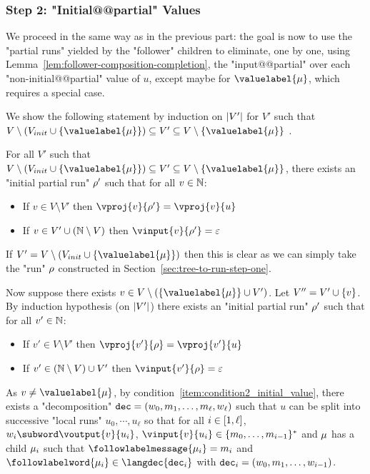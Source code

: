 	\subsubsection{Step 2: "Initial@@partial" Values}
	\label{sec:tree-to-run-step-two}
	
	We proceed in the same way as in the previous part: the goal is now to use the "partial runs" yielded by the "follower" children to eliminate, one by one, using Lemma~\ref{lem:follower-composition-completion}, the "input@@partial" over each "non-initial@@partial" value of $u$, except maybe for $\valuelabel{\node}$, which requires a special case.
	
	We show the following statement by induction on $|V'|$ for $V'$ such that $V \setminus (V_{init} \cup \set{\valuelabel{\node}}) \subseteq V' \subseteq V \setminus \set{\valuelabel{\node}}$ .
	
	For all $V'$ such that $V \setminus (V_{init} \cup \set{\valuelabel{\node}}) \subseteq V' \subseteq V \setminus \set{\valuelabel{\node}}$, there exists an "initial partial run" $\rho'$ such that for all $v \in \mathbb{N}$:
	\begin{itemize}		
		\item If $v \in V \setminus V'$ then $\vproj{v}{\run'} = \vproj{v}{u}$
		
		\item If $v \in V' \cup (\mathbb{N} \setminus V)$ then $\vinput{v}{\run'} = \epsilon$
	\end{itemize}  

If $V' = V \setminus (V_{init} \cup \set{\valuelabel{\node}})$ then this is clear as we can simply take the "run" $\rho$ constructed in Section~\ref{sec:tree-to-run-step-one}.

Now suppose there exists $v \in V \setminus (\set{\valuelabel{\node}} \cup V')$. Let $V'' = V' \cup \{v\}$. By induction hypothesis (on $|V'|$) there exists an "initial partial run" $\rho'$ such that for all $v' \in \mathbb{N}$:
\begin{itemize}
	\item If $v' \in V \setminus V'$ then $\vproj{v'}{\run} = \vproj{v'}{u}$
	
	\item If $v' \in (\mathbb{N} \setminus V) \cup V'$ then $\vinput{v'}{\run} = \epsilon$
\end{itemize}

As $v \neq \valuelabel{\node}$, by condition~\ref{item:condition2_initial_value}, there exists a "decomposition" $\mathtt{dec} = (w_0, m_1, \ldots, m_\ell, w_\ell)$ such that $u$ can be split into successive "local runs" $u_0, \cdots, u_\ell$ so that for all $i \in [1,\ell]$, $w_i \subword \voutput{v}{u_i}$, $\vinput{v}{u_i} \in \set{m_0, \ldots, m_{i-1}}^*$ and $\mu$ has a child $\mu_i$ such that $\followlabelmessage{\mu_i} = m_i$ and $\followlabelword{\node_i} \in \langdec{\decsymb_i}$ with $\mathtt{dec}_i = (w_0, m_1, \ldots, w_{i-1})$.

